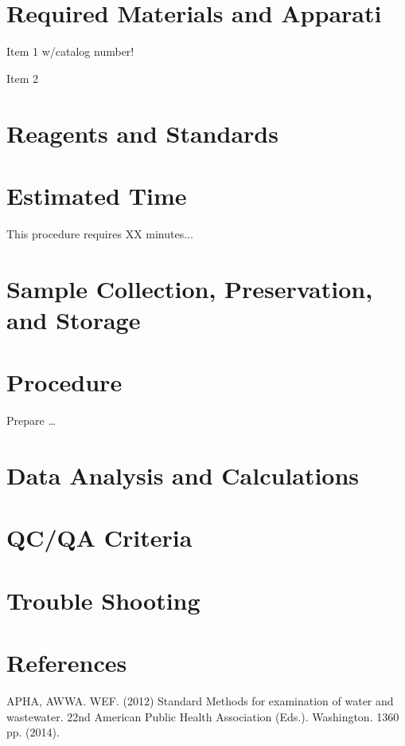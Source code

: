 \documentclass[12pt]{../SOP3_beta}
\begin{document}
\section{Required Materials and Apparati}

\NP Item 1 w/catalog number!

\NP Item 2

\section{Reagents and Standards}

\section{Estimated Time}

\NP This procedure requires XX minutes...

\section{Sample Collection, Preservation, and Storage}

\section{Procedure}

\NP Prepare \dots

\NP

\section{Data Analysis and Calculations}

\section{QC/QA Criteria}

\section{Trouble Shooting}

\section{References}

\NP APHA, AWWA. WEF. (2012) Standard Methods for examination of water and wastewater. 22nd American Public Health Association (Eds.). Washington. 1360 pp. (2014).
\end{document}
